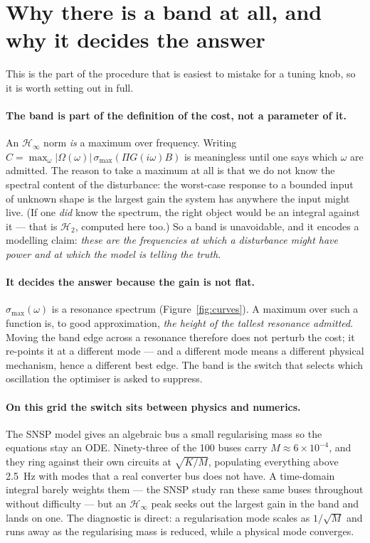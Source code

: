 \documentclass[11pt,a4paper]{article}
\newcommand{\Hinf}{\ensuremath{\mathcal{H}_\infty}}
\newcommand{\Htwo}{\ensuremath{\mathcal{H}_2}}
\begin{document}
\section{Why there is a band at all, and why it decides the answer}
\label{sec:band}

This is the part of the procedure that is easiest to mistake for a tuning knob,
so it is worth setting out in full.

\paragraph{The band is part of the definition of the cost, not a parameter of it.}
An \Hinf{} norm \emph{is} a maximum over frequency. Writing
$C=\max_\omega |\Omega(\omega)|\,\sigma_{\max}(\Pi G(i\omega)B)$ is meaningless
until one says which $\omega$ are admitted. The reason to take a maximum at all
is that we do not know the spectral content of the disturbance: the worst-case
response to a bounded input of unknown shape is the largest gain the system has
anywhere the input might live. (If one \emph{did} know the spectrum, the right
object would be an integral against it --- that is \Htwo{}, computed here too.)
So a band is unavoidable, and it encodes a modelling claim: \emph{these are the
frequencies at which a disturbance might have power and at which the model is
telling the truth.}

\paragraph{It decides the answer because the gain is not flat.}
$\sigma_{\max}(\omega)$ is a resonance spectrum (Figure~\ref{fig:curves}). A
maximum over such a function is, to good approximation, \emph{the height of the
tallest resonance admitted}. Moving the band edge across a resonance therefore
does not perturb the cost; it re-points it at a different mode --- and a
different mode means a different physical mechanism, hence a different best edge.
The band is the switch that selects which oscillation the optimiser is asked to
suppress.

\paragraph{On this grid the switch sits between physics and numerics.}
The SNSP model gives an algebraic bus a small regularising mass so the equations
stay an ODE. Ninety-three of the 100 buses carry $M\approx6\times10^{-4}$, and
they ring against their own circuits at $\sqrt{K/M}$, populating everything above
\SI{2.5}{\hertz} with modes that a real converter bus does not have. A
time-domain integral barely weights them --- the SNSP study ran these same buses
throughout without difficulty --- but an \Hinf{} peak seeks out the largest gain
in the band and lands on one. The diagnostic is direct: a regularisation mode
scales as $1/\sqrt{M}$ and runs away as the regularising mass is reduced, while a
physical mode converges.
\end{document}

